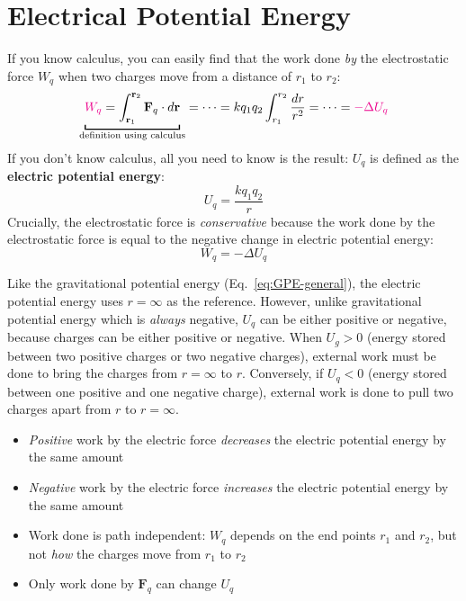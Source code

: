 
\section{Electrical Potential Energy}
If you know calculus, you can easily find that the work done \emph{by} the
electrostatic force $W_q$ when two charges move from a distance of $r_1$ to
$r_2$:
\begin{equation}
  \underbracket[1pt]{{\color{magenta}W_q}=
  \int_{\mathbf r_1}^{\mathbf r_2}\mathbf F_q\cdot d\mathbf r}_\text{definition using
      calculus}
    =\cdots = kq_1q_2\int_{r_1}^{r_2}\frac{dr}{r^2}=\cdots
    ={\color{magenta}-\Delta U_q}
\end{equation}
If you don't know calculus, all you need to know is the result: $U_q$ is
defined as the \textbf{electric potential energy}:
\begin{equation}
  \boxed{
    U_q=\frac{kq_1q_2}r
  }
\end{equation}
Crucially, the electrostatic force is \emph{conservative} because the work done
by the electrostatic force is equal to the negative change in electric
potential energy:
\begin{equation}
  \boxed{
    W_q=-\Delta U_q
  }
\end{equation}



Like the gravitational potential energy (Eq.~\ref{eq:GPE-general}), the
electric potential energy uses  $r=\infty$ as the reference. However, unlike
gravitational potential energy which is \emph{always} negative, $U_q$ can be
either positive or negative, because charges can be either positive or
negative. When $U_g>0$ (energy stored between two positive charges or two
negative charges), external work must be done to bring the charges from
$r=\infty$ to $r$. Conversely, if $U_q<0$ (energy stored between one positive
and one negative charge), external work is done to pull two charges apart from
$r$ to $r=\infty$.


\begin{itemize}
\item\emph{Positive} work by the electric force \emph{decreases} the
  electric potential energy by the same amount
\item \emph{Negative} work by the electric force \emph{increases} the
  electric potential energy by the same amount
\item Work done is path independent: $W_q$ depends on the end points $r_1$ and
  $r_2$, but not \emph{how} the charges move from $r_1$ to $r_2$
\item Only work done by $\mathbf F_q$ can change $U_q$
\end{itemize}




